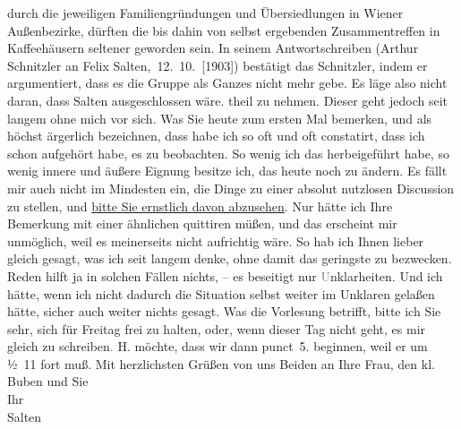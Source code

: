 \begin{ledgroupsized}[t]{13cm}
{{{                  durch die jeweiligen Familiengründungen und Übersiedlungen in Wiener Außenbezirke, dürften die bis dahin von selbst
                  ergebenden Zusammentreffen in Kaffeehäusern seltener geworden sein. In seinem
                  Antwortschreiben (Arthur Schnitzler an Felix Salten, 12. 10. [1903]) bestätigt das
                     Schnitzler, indem er argumentiert, dass
                  es die Gruppe als Ganzes nicht mehr gebe. Es läge also nicht daran, dass Salten ausgeschlossen wäre. }}}\label{K_L03347-2h} theil zu
               nehmen. Dieser geht jedoch seit langem ohne mich vor sich. Was Sie heute zum ersten Mal bemerken, und als höchst ärgerlich
               bezeichnen, dass habe ich so oft und oft constatirt, dass ich schon aufgehört habe,
               es zu beobachten. So wenig ich das herbeigeführt habe, so wenig innere und äußere
               Eignung besitze ich, das heute noch zu ändern. Es fällt mir auch nicht im Mindesten
               ein, die Dinge zu einer absolut nutzlosen Discussion zu stellen, und \uline{bitte Sie ernstlich davon abzusehen}. Nur hätte ich
               Ihre Bemerkung mit einer ähnlichen quittiren müßen, und das erscheint mir unmöglich,
               weil es meinerseits nicht aufrichtig wäre. So hab ich Ihnen lieber gleich gesagt, was
               ich seit langem denke, ohne damit das geringste zu bezwecken. Reden hilft ja in
               solchen Fällen nichts, – es beseitigt nur \textcolor{gray}{U}nklarheiten. Und ich
               hätte, wenn ich nicht dadurch die Situation selbst weiter im Unklaren gelaßen hätte,
               sicher auch weiter nichts gesagt.\pend
           \pstart
           {\pb}Was die Vorlesung betrifft,
               bitte ich Sie sehr, sich für Freitag frei zu halten,
               oder, wenn dieser Tag nicht geht, es mir gleich zu schreiben\textcolor{gray}{.}{ }H. möchte, dass wir dann punct 5.
               beginnen, weil er um ½ 11 fort muß.\pend
           \pstart
           Mit herzlichsten Grüßen von uns Beiden an Ihre Frau,
               den kl. Buben und Sie
               {\\}Ihr {\\}\spacefill\mbox{Salten}\pend
           

\end{ledgroupsized}
